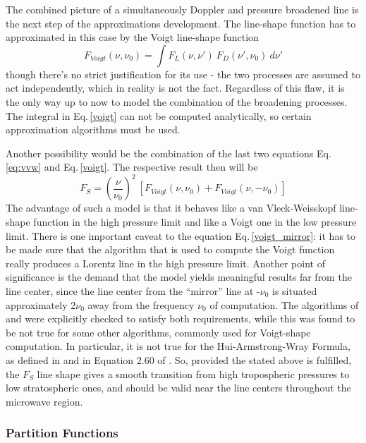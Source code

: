 The combined picture of a simultaneously Doppler and pressure
broadened line is the next step of the approximations development. The
line-shape function has to approximated in this case by the Voigt line-shape
function 
\begin{equation}\label{voigt}
 F_{Voigt}(\nu,\nu_0)= \int F_L(\nu,\nu')~F_D(\nu',\nu_0)~d\nu'
\end{equation}
though there's no strict justification for its use - the two processes
are assumed to act independently, which in reality is not the
fact. Regardless of this flaw, it is the only way up to now to model
the combination of the broadening processes. The integral in Eq.\,\ref{voigt}
can not be computed analytically, so certain approximation algorithms
must be used.


Another possibility would be the combination of the last two equations
Eq.\,\ref{eq:vvw} and Eq.\,\ref{voigt}. The respective result then will be 
\begin{equation}\label{voigt_mirror}
 F_S=\left(\frac{\nu}{\nu_0}\right)^2~[F_{Voigt}(\nu,\nu_0)+F_{Voigt}(\nu,-\nu_0)]
\end{equation}
The advantage of such a model is that it behaves like a van
Vleck-Weisskopf line-shape function in the high pressure limit and
like a Voigt one in the low pressure limit. There is one important
caveat to the equation Eq.\,\ref{voigt_mirror}: it has to be made sure that the
algorithm that is used to compute the Voigt function really produces a
Lorentz line in the high pressure limit. Another point of significance
is the demand that the model yields meaningful results far from the
line center, since the line center from the ``mirror'' line at
-$\nu_0$ is situated approximately 2$\nu_0$ away from the frequency
$\nu_0$ of computation. The algorithms of \citet{Drayson:76} and
\citet{Oliveiro:77} were explicitly checked to satisfy both
requirements, while this was found to be not true for some other
algorithms, commonly used for Voigt-shape computation. In particular,
it is not true for the Hui-Armstrong-Wray Formula, as defined in
\citet{hui:78} and in Equation 2.60 of \citet{pwr:93}. So, provided
the stated above is fulfilled, the $F_S$ line shape gives a smooth
transition from high tropospheric pressures to low stratospheric ones,
and should be valid near the line centers throughout the microwave region.






\subsubsection{Partition Functions}


